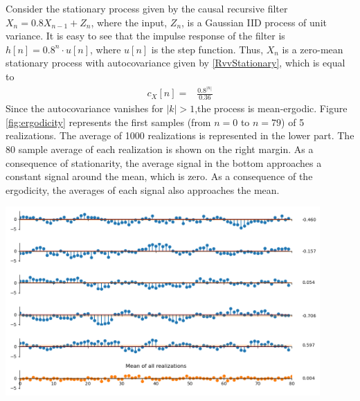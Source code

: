 \begin{example}\label{ex:ergodic}

Consider the stationary process given by the causal recursive filter $X_n = 0.8 X_{n-1} + Z_n$, where the input, $Z_n$, is a Gaussian IID process of unit variance. It is easy to see that the impulse response of the filter is $h[n] = 0.8^n \cdot u[n]$, where $u[n]$ is the step function. Thus, $X_n$ is a zero-mean stationary process with autocovariance given by \eqref{RvvStationary}, which is equal to
\begin{align}
c_X[n] =& \frac{0.8 ^{|n|}}{0.36} 
\end{align}
Since the autocovariance vanishes for $|k|>1$,the process is mean-ergodic. Figure \ref{fig:ergodicity} represents the first samples (from $n=0$ to $n=79$) of 5 realizations. The average of 1000 realizations is represented in the lower part. The 80 sample average of each realization is shown on the right margin. As a consequence of stationarity, the average signal in the bottom approaches a constant signal around the mean, which is zero. As a consequence of the ergodicity, the averages of each signal also approaches the mean.

\begin{center}
\includegraphics[width=12cm]{Figures/sp_ergodicity.png}
\label{fig:ergodicity}
\end{center}

\end{example}






